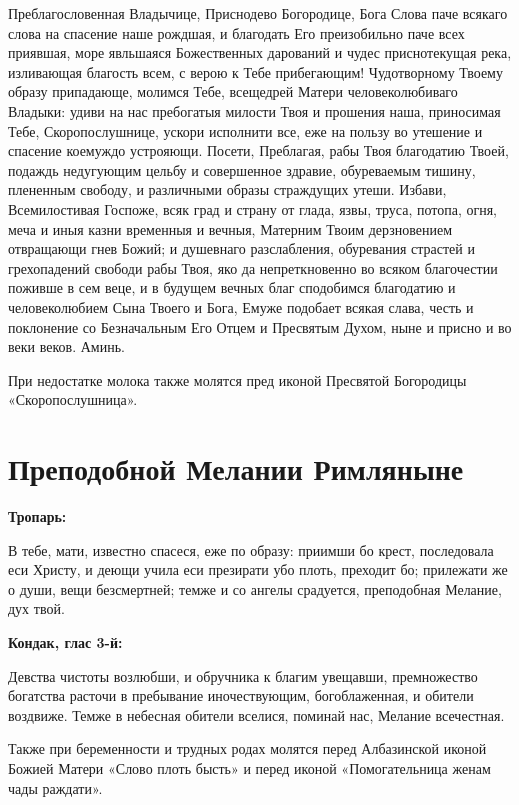 Преблагословенная Владычице, Приснодево Богородице, Бога Слова паче всякаго слова на спасение наше рождшая, и благодать Его преизобильно паче всех приявшая, море явльшаяся Божественных дарований и чудес приснотекущая река, изливающая благость всем, с верою к Тебе прибегающим! Чудотворному Твоему образу припадающе, молимся Тебе, всещедрей Матери человеколюбиваго Владыки: удиви на нас пребогатыя милости Твоя и прошения наша, приносимая Тебе, Скоропослушнице, ускори исполнити все, еже на пользу во утешение и спасение коемуждо устрояющи. Посети, Преблагая, рабы Твоя благодатию Твоей, подаждь недугующим цельбу и совершенное здравие, обуреваемым тишину, плененным свободу, и различными образы страждущих утеши. Избави, Всемилостивая Госпоже, всяк град и страну от глада, язвы, труса, потопа, огня, меча и иныя казни временныя и вечныя, Матерним Твоим дерзновением отвращающи гнев Божий; и душевнаго разслабления, обуревания страстей и грехопадений свободи рабы Твоя, яко да непреткновенно во всяком благочестии поживше в сем веце, и в будущем вечных благ сподобимся благодатию и человеколюбием Сына Твоего и Бога, Емуже подобает всякая слава, честь и поклонение со Безначальным Его Отцем и Пресвятым Духом, ныне и присно и во веки веков. Аминь.

При недостатке молока также молятся пред иконой Пресвятой Богородицы «Скоропослушница».

\section{Преподобной Мелании Римляныне}
 
\bfseries Тропарь:\normalfont{}\nopagebreak


В тебе, мати, известно спасеся, еже по образу: приимши бо крест, последовала еси Христу, и деющи учила еси презирати убо плоть, преходит бо; прилежати же о души, вещи безсмертней; темже и со ангелы срадуется, преподобная Мелание, дух твой.


\medskip
\bfseries Кондак, глас 3-й:\normalfont{}\nopagebreak


Девства чистоты возлюбши, и обручника к благим увещавши, премножество богатства расточи в пребывание иночествующим, богоблаженная, и обители воздвиже. Темже в небесная обители вселися, поминай нас, Мелание всечестная.

Также при беременности и трудных родах молятся перед Албазинской иконой Божией Матери «Слово плоть бысть» и перед иконой «Помогательница женам чады раждати».

